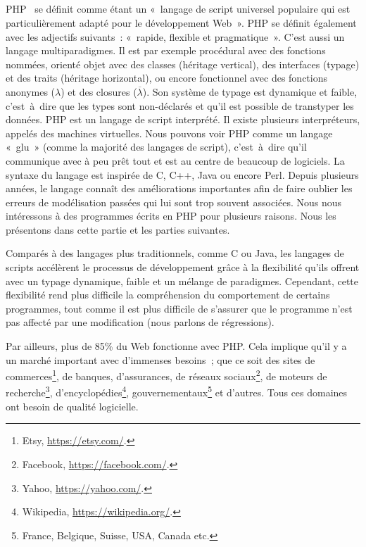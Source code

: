 \subsection{}

PHP~ se définit comme étant un «~langage de script universel
populaire qui est particulièrement adapté pour le développement Web~». PHP se
définit également avec les adjectifs suivants~: «~rapide, flexible et
pragmatique~». C'est aussi un langage multiparadigmes. Il est par exemple
procédural avec des fonctions nommées, orienté objet avec des classes (héritage
vertical), des interfaces (typage) et des traits (héritage horizontal), ou
encore fonctionnel avec des fonctions anonymes ($\lambda$) et des closures
($\overline{\lambda}$). Son système de typage est dynamique et faible,
c'est~à~dire que les types sont non-déclarés et qu'il est possible de transtyper
les données. PHP est un langage de script interprété. Il existe plusieurs
interpréteurs, appelés des machines virtuelles. Nous pouvons voir PHP comme un
langage «~glu~» (comme la majorité des langages de script), c'est~à~dire qu'il
communique avec à peu prêt tout et est au centre de beaucoup de logiciels. La
syntaxe du langage est inspirée de C, C++, Java ou encore Perl.  Depuis
plusieurs années, le langage connaît des améliorations importantes afin de faire
oublier les erreurs de modélisation passées qui lui sont trop souvent associées.
Nous nous intéressons à des programmes écrits en PHP pour plusieurs raisons.
Nous les présentons dans cette partie et les parties suivantes.

Comparés à des langages plus traditionnels, comme C ou Java, les langages de
scripts accélèrent le processus de développement grâce à la flexibilité qu'ils
offrent avec un typage dynamique, faible et un mélange de paradigmes. Cependant,
cette flexibilité rend plus difficile la compréhension du comportement de
certains programmes, tout comme il est plus difficile de s'assurer que le
programme n'est pas affecté par une modification (nous parlons de régressions).

Par ailleurs, plus de 85\% du Web fonctionne avec PHP.  Cela implique qu'il y a
un marché important avec d'immenses besoins~; que ce soit des sites de
commerces\footnote{Etsy, \url{https://etsy.com/}.}, de banques, d'assurances, de
réseaux sociaux\footnote{Facebook, \url{https://facebook.com/}.}, de moteurs de
recherche\footnote{Yahoo, \url{https://yahoo.com/}.},
d'encyclopédies\footnote{Wikipedia, \url{https://wikipedia.org/}.},
gouvernementaux\footnote{France, Belgique, Suisse, USA, Canada etc.} et
d'autres. Tous ces domaines ont besoin de qualité logicielle.


